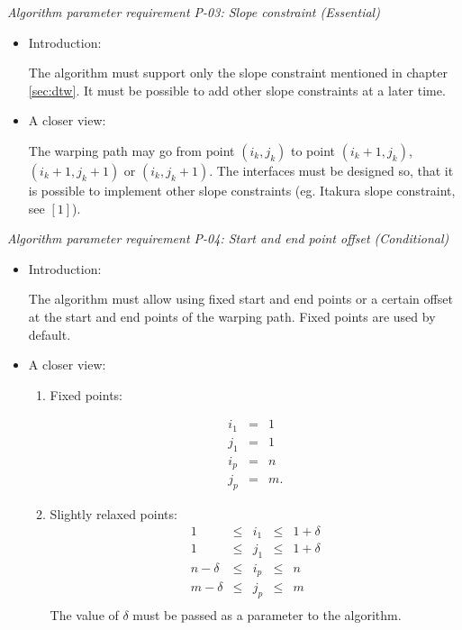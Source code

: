 \documentclass[a4paper,11pt]{article}
\begin{document}
\noindent \emph{Algorithm parameter requirement P-03: Slope constraint (Essential)}
\begin{itemize}
\item Introduction:

The algorithm must support only the slope constraint mentioned in chapter \ref{sec:dtw}. It must be possible
to add other slope constraints at a later time.

\item A closer view:

The warping path may go from point $(i_k,j_k)$ to point $(i_k+1,j_k)$, $(i_k+1,j_k+1)$ or $(i_k,j_k+1)$.
The interfaces must be designed so, that it is possible to implement other slope constraints (eg. 
Itakura slope constraint, see $[1]$).
\end{itemize}


\noindent \emph{Algorithm parameter requirement P-04: Start and end point offset (Conditional)}
\begin{itemize}
\item Introduction:

The algorithm must allow using fixed start and end points or a certain offset at the start and end points 
of the warping path. Fixed points are used by default.
\item A closer view:
\begin{enumerate}
\item Fixed points:

\begin{equation}
\begin{array}{rcl}
i_1 &=& 1 \\
j_1 &=& 1 \\ 
i_p &=& n \\
j_p &=& m . 
\end{array}
\end{equation}

\item Slightly relaxed points:
\begin{equation}
\begin{array}{rcccl}
1 &\leq& i_1 &\leq& 1+\delta \\
1 &\leq& j_1 &\leq& 1+\delta \\
n-\delta &\leq& i_p &\leq& n \\
m-\delta &\leq& j_p &\leq& m \\
\end{array}
\end{equation}
The value of $\delta$ must be passed as a parameter to the algorithm.
\end{enumerate}
\end{itemize}
\end{document}
